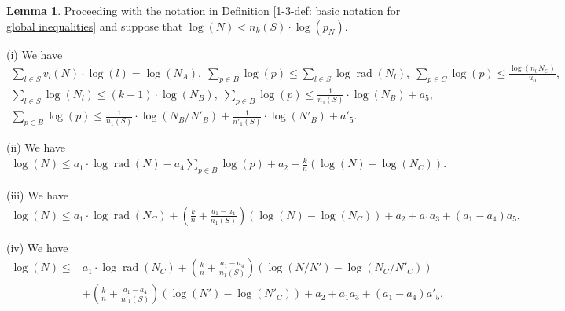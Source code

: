 \documentclass[a4paper, 12pt]{article}
\DeclareMathOperator{\rad}{\text{rad}}
\numberwithin{equation}{section}
\theoremstyle{definition}
\newtheorem{lem}[thm]{Lemma}
\begin{document}
\begin{lem} \label{1-3-lem: local-global inequalities}
Proceeding with the notation in Definition \ref{1-3-def: basic notation for global inequalities} and suppose that $\log(N) < n_k(S) \cdot \log(p_N)$.

(i) We have
\small\begin{gather*}
\sum_{l\in S}v_l(N)\cdot\log(l) = \log(N_A),
\; \sum_{p\in B} \log(p) \le  \sum_{l\in S} \log\rad(N_l) ,
\;  \sum_{p\in C} \log(p) \le \frac{\log(n_0 N_C)}{u_0}, 
\\ \sum_{l\in S} \log(N_l)\le (k-1)\cdot\log(N_B),
\; \sum_{p\in B} \log(p) \le \frac{1}{n_1(S)} \cdot \log(N_B) + a_5 ,
\\ \sum_{p\in B} \log(p) \le \frac{1}{n_1(S)} \cdot \log(N_B/N'_B) +  \frac{1}{n'_1(S)} \cdot \log(N'_B) + a'_5 .
\end{gather*}\normalsize

(ii) We have
\small\begin{align}  \label{1-1-eq3}
   \log(N) \le a_1\cdot\log\rad(N) - a_4 \sum_{p\in B}\log(p) + a_2 + \frac{k}{n}(\log(N)-\log(N_C)).
\end{align}\normalsize

(iii) We have
\small\begin{align*}
    \log(N) \le a_1\cdot\log\rad(N_C) + (\frac{k}{n}+ \frac{a_1-a_4}{n_1(S)})(\log(N)-\log(N_C))
    + a_2 + a_1a_3 + (a_1-a_4)a_5 .
\end{align*}\normalsize

(iv) We have 
\small\begin{align*}
\log(N) \le &  a_1 \cdot \log\rad(N_C) 
+ (\frac{k}{n} + \frac{a_1-a_4}{n_1(S)})(\log(N/N')-\log(N_C/N'_C))
\\ & + (\frac{k}{n} + \frac{a_1-a_4}{n'_1(S)})(\log(N')-\log(N'_C))
+ a_2 + a_1a_3 + (a_1-a_4)a'_5 .
\end{align*}\normalsize


\end{lem}
\end{document}
